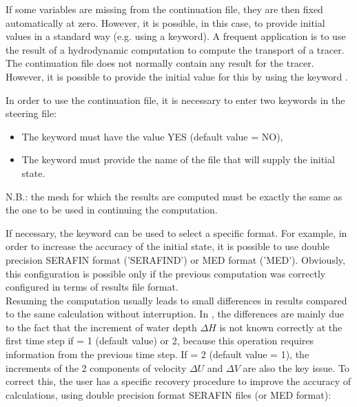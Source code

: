If some variables are missing from the continuation file,
they are then fixed automatically at zero.
However, it is possible, in this case, to provide initial values in a standard
way (e.g. using a keyword).
A frequent application is to use the result of a hydrodynamic computation
to compute the transport of a tracer.
The continuation file does not normally contain any result for the tracer.
However, it is possible to provide the initial value for this by using
the keyword .

In order to use the continuation file, it is necessary to enter
two keywords in the steering file:

\begin{itemize}
\item The keyword  must have the value YES
(default value = NO),

\item The keyword  must provide
the name of the file that will supply the initial state.
\end{itemize}

N.B.: the mesh for which the results are computed must be exactly the same
as the one to be used in continuing the computation.

If necessary, the keyword 
can be used to select a specific format.
For example, in order to increase the accuracy of the initial state,
it is possible to use double precision SERAFIN format ('SERAFIND') or
MED format ('MED').
Obviously, this configuration is possible only if the previous computation
was correctly configured in terms of results file format.
\\

Resuming the computation usually leads to small differences in results
compared to the same calculation without interruption.
In , the differences are mainly due to the fact that
the increment of water depth $\Delta H$ is not known correctly at
the first time step if  = 1 (default value) or 2,
because this operation requires information from the
previous time step.
If  = 2 (default value = 1), the increments of
the 2 components of velocity $\Delta U$ and $\Delta V$ are also the key issue.
To correct this, the user has a specific recovery procedure
to improve the accuracy of calculations, using double precision format SERAFIN
files (or MED format):

